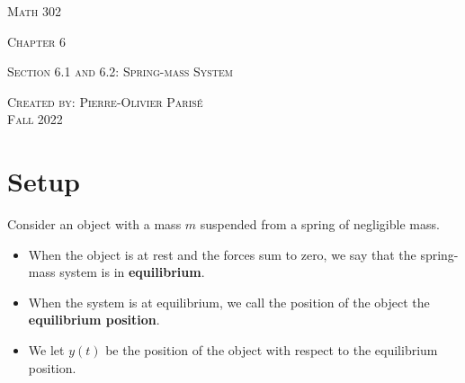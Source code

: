 \documentclass[12pt,a4paper]{article}
\begin{document}
\thispagestyle{empty}

\begin{center}
\vspace*{2.5cm}

{\Huge \textsc{Math 302}}

\vspace*{2cm}

{\LARGE \textsc{Chapter 6}} 

\vspace*{0.75cm}

\noindent\textsc{Section 6.1 and 6.2: Spring-mass System}

\vspace*{0.75cm}

\tableofcontents

\vfill

\noindent \textsc{Created by: Pierre-Olivier Paris{\'e}} \\
\textsc{Fall 2022}
\end{center}

\newpage

\section{Setup}

Consider an object with a mass $m$ suspended from a spring of negligible mass.
	\begin{itemize}
	\item When the object is at rest and the forces sum to zero, we say that the spring-mass system is in \textbf{equilibrium}.
	\item When the system is at equilibrium, we call the position of the object the \textbf{equilibrium position}.
	\item We let $y(t)$ be the position of the object with respect to the equilibrium position.
	\end{itemize}
	
\vspace*{20pt}
\end{document}

